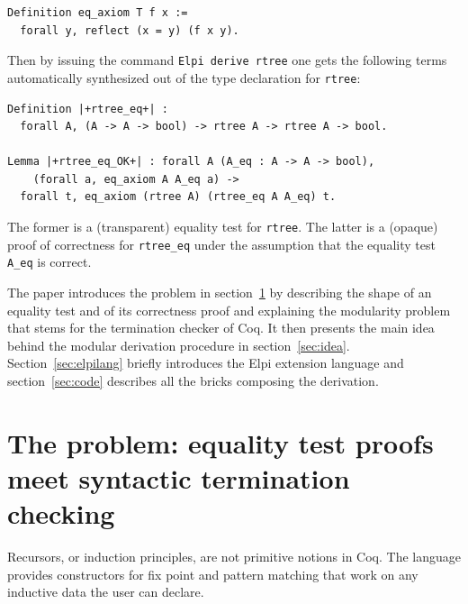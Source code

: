 \documentclass[sigplan,10pt,review]{acmart}\settopmatter{printfolios=true,printccs=false,printacmref=false}
\begin{document}
\begin{minipage}{\textwidth}\begin{lstlisting}
Definition eq_axiom T f x :=
  forall y, reflect (x = y) (f x y).
\end{lstlisting}\end{minipage}

\noindent
Then by issuing the command \lstinline+Elpi derive rtree+ one gets
the following terms automatically synthesized out of the type
declaration for \lstinline+rtree+:

\begin{minipage}{\textwidth}\begin{lstlisting}
Definition |+rtree_eq+| :
  forall A, (A -> A -> bool) -> rtree A -> rtree A -> bool.

Lemma |+rtree_eq_OK+| : forall A (A_eq : A -> A -> bool),
    (forall a, eq_axiom A A_eq a) ->
  forall t, eq_axiom (rtree A) (rtree_eq A A_eq) t.
\end{lstlisting}\end{minipage}

\noindent
The former is a (transparent) equality test for \lstinline+rtree+.
The latter is a (opaque) proof of correctness for \lstinline+rtree_eq+
under the assumption that the equality test \lstinline+A_eq+ is correct.

The paper introduces the problem in
section~\ref{sec:problem} by describing the shape of an equality test
and of its correctness proof and explaining the modularity problem
that stems for the termination checker of Coq. It then
presents the main idea behind the
modular derivation procedure in section~\ref{sec:idea}.
Section~\ref{sec:elpilang} briefly introduces the Elpi extension language
and section~\ref{sec:code} describes all the bricks composing the
derivation.


\section{The problem: equality test proofs meet syntactic termination checking} %
\label{sec:problem}

Recursors, or induction principles, are not primitive notions in Coq.
The language provides constructors for fix point and pattern matching
that work on any inductive data the user can declare.
\end{document}
